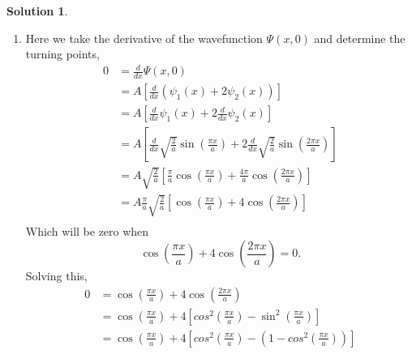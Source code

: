 \documentclass[10pt]{article}
\theoremstyle{definition}
\newtheorem{soln}{Solution}
\begin{document}
\begin{soln}
\begin{enumerate}[label=(\alph*)]
\begin{center}
          \end{center}
    \item Here we take the derivative of the wavefunction $\Psi(x,0)$ and determine the turning points,
          \begin{align*}
            0 & =\frac{d}{dx}\Psi(x,0)                                                                                                                         \\
              & =A\left[\frac{d}{dx}(\psi_1(x)+2\psi_2(x))\right]                                                                                              \\
              & =A\left[\frac{d}{dx}\psi_1(x)+2\frac{d}{dx}\psi_2(x)\right]                                                                                    \\
              & =A\left[\frac{d}{dx}\sqrt{\frac{2}{a}}\sin\left(\frac{\pi x}{a}\right)+2\frac{d}{dx}\sqrt{\frac{2}{a}}\sin\left(\frac{2\pi x}{a}\right)\right] \\
              & =A\sqrt{\frac{2}{a}}\left[\frac{\pi}{a}\cos\left(\frac{\pi x}{a}\right)+\frac{4\pi}{a}\cos\left(\frac{2\pi x}{a}\right)\right]                 \\
              & =A\frac{\pi}{a}\sqrt{\frac{2}{a}}\left[\cos\left(\frac{\pi x}{a}\right)+4\cos\left(\frac{2\pi x}{a}\right)\right]                              \\
          \end{align*}
          Which will be zero when
          $$\cos\left(\frac{\pi x}{a}\right)+4\cos\left(\frac{2\pi x}{a}\right)=0.$$
          Solving this,
          \begin{align*}
            0 & =\cos\left(\frac{\pi x}{a}\right)+4\cos\left(\frac{2\pi x}{a}\right)                                                               \\
              & =\cos\left(\frac{\pi x}{a}\right)+4\left[cos^2\left(\frac{\pi x}{a}\right)-\sin^2\left(\frac{\pi x}{a}\right)\right]               \\
              & =\cos\left(\frac{\pi x}{a}\right)+4\left[cos^2\left(\frac{\pi x}{a}\right)-\left(1-cos^2\left(\frac{\pi x}{a}\right)\right)\right] \\

\end{align*}
\end{enumerate}
\end{soln}
\end{document}
